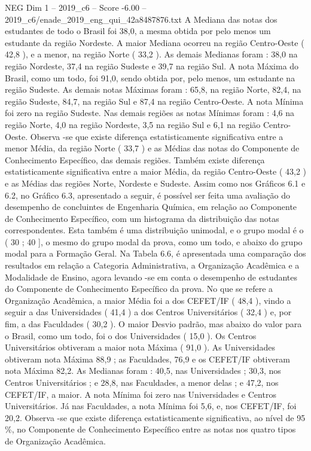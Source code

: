 \begin{textsample}{NEG Dim 1 – 2019\_c6 – Score -6.00 – 2019\_c6/enade\_2019\_eng\_qui\_42a8487876.txt}
A Mediana das notas dos estudantes de todo o Brasil foi 38,0, a mesma obtida por pelo menos um estudante da região Nordeste.
A maior Mediana ocorreu na região Centro-Oeste ( 42,8 ), e a menor, na região Norte ( 33,2 ).
As demais Medianas foram : 38,0 na região Nordeste, 37,4 na região Sudeste e 39,7 na região Sul.
A nota Máxima do Brasil, como um todo, foi 91,0, sendo obtida por, pelo menos, um estudante na região Sudeste.
As demais notas Máximas foram : 65,8, na região Norte, 82,4, na região Sudeste, 84,7, na região Sul e 87,4 na região Centro-Oeste.
A nota Mínima foi zero na região Sudeste.
Nas demais regiões as notas Mínimas foram : 4,6 na região Norte, 4,0 na região Nordeste, 3,5 na região Sul e 6,1 na região Centro-Oeste.
Observa -se que existe diferença estatisticamente significativa entre a menor Média, da região Norte ( 33,7 ) e as Médias das notas do Componente de Conhecimento Específico, das demais regiões.
Também existe diferença estatisticamente significativa entre a maior Média, da região Centro-Oeste ( 43,2 ) e as Médias das regiões Norte, Nordeste e Sudeste.
Assim como nos Gráficos 6.1 e 6.2, no Gráfico 6.3, apresentado a seguir, é possível ser feita uma avaliação do desempenho de concluintes de Engenharia Química, em relação ao Componente de Conhecimento Específico, com um histograma da distribuição das notas correspondentes.
Esta também é uma distribuição unimodal, e o grupo modal é o ( 30 ; 40 ], o mesmo do grupo modal da prova, como um todo, e abaixo do grupo modal para a Formação Geral.
Na Tabela 6.6, é apresentada uma comparação dos resultados em relação a Categoria Administrativa, a Organização Acadêmica e a Modalidade de Ensino, agora levando -se em conta o desempenho de estudantes do Componente de Conhecimento Específico da prova.
No que se refere a Organização Acadêmica, a maior Média foi a dos CEFET/IF ( 48,4 ), vindo a seguir a das Universidades ( 41,4 ) a dos Centros Universitários ( 32,4 ) e, por fim, a das Faculdades ( 30,2 ).
O maior Desvio padrão, mas abaixo do valor para o Brasil, como um todo, foi o dos Universidades ( 15,0 ).
Os Centros Universitários obtiveram a maior nota Máxima ( 91,0 ).
As Universidades obtiveram nota Máxima 88,9 ; as Faculdades, 76,9 e os CEFET/IF obtiveram nota Máxima 82,2.
As Medianas foram : 40,5, nas Universidades ; 30,3, nos Centros Universitários ; e 28,8, nas Faculdades, a menor delas ; e 47,2, nos CEFET/IF, a maior.
A nota Mínima foi zero nas Universidades e Centros Universitários.
Já nas Faculdades, a nota Mínima foi 5,6, e, nos CEFET/IF, foi 20,2.
Observa -se que existe diferença estatisticamente significativa, ao nível de 95 \%, no Componente de Conhecimento Específico entre as notas nos quatro tipos de Organização Acadêmica.

\end{textsample}
